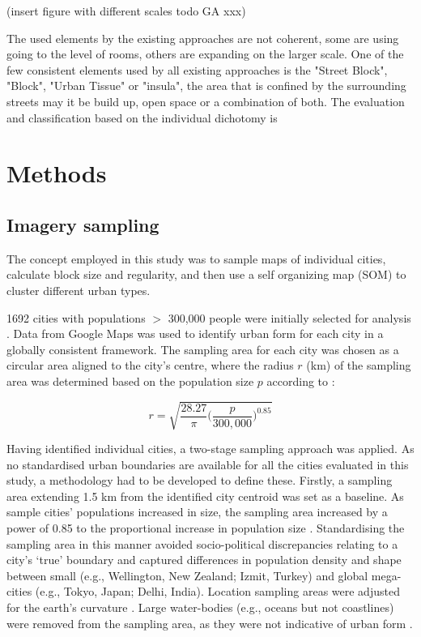 \documentclass[final,3p,times,authoryear]{elsarticle}
\begin{document}
(insert figure with different scales todo GA xxx)

The used elements by the existing approaches are not coherent, some are using going to the level of rooms, others are expanding on the larger scale. One of the few consistent elements used by all existing approaches is the "Street Block", "Block", "Urban Tissue" or "insula", the area that is confined by the surrounding streets may it be build up, open space or a combination of both.
The evaluation and classification based on the individual dichotomy is 



\section{Methods}\label{sec:Methods}

\subsection{Imagery sampling}\label{sec:methods2}
The concept employed in this study was to sample maps of individual cities, calculate block size and regularity, and then use a self organizing map (SOM) to cluster different urban types.

1692 cities with populations $>$ 300,000 people were initially selected for analysis \citep{UN2014}. Data from Google Maps was used to identify urban form for each city in a globally consistent framework. The sampling area for each city was chosen as a circular area aligned to the city's centre, where the radius $r$ (km) of the sampling area was determined based on the population size $p$ according to \citet{Barthelemy2016}: 

\begin{equation}
r = \sqrt{ \frac{28.27}{\pi} \bigg( \frac{p}{300,000}  \bigg)^{0.85} }
\end{equation}


Having identified individual cities, a two-stage sampling approach was applied. As no standardised urban boundaries are available for all the cities evaluated in this study, a methodology had to be developed to define these. Firstly, a sampling area extending 1.5 km from the identified city centroid \citep{UN2014} was set as a baseline. As sample cities' populations increased in size, the sampling area increased by a power of 0.85 to the proportional increase in population size \citep{Barthelemy2016}. Standardising the sampling area in this manner avoided socio-political discrepancies relating to a city's `true' boundary and captured differences in population density and shape between small (e.g., Wellington, New Zealand; Izmit, Turkey) and global mega-cities (e.g., Tokyo, Japan;  Delhi, India). Location sampling areas were adjusted for the earth's curvature \citep{Sinnott1984}. Large water-bodies (e.g., oceans but not coastlines) were removed from the sampling area, as they were not indicative of urban form . 
\end{document}
